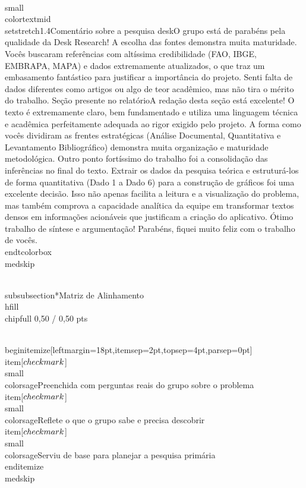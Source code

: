 \documentclass[11pt, a4paper]{article}
\newcommand{\chipfull}[1]{\colorbox{sagedim}{\color{sage}\semibold\small\strut\ #1\ }}
\begin{document}
{\\small\\color{textmid}\\setstretch{1.4}Comentário sobre a pesquisa deskO grupo está de parabéns pela qualidade da Desk Research! A escolha das fontes demonstra muita maturidade. Vocês buscaram referências com altíssima credibilidade (FAO, IBGE, EMBRAPA, MAPA) e dados extremamente atualizados, o que traz um embasamento fantástico para justificar a importância do projeto. Senti falta de dados diferentes como artigos ou algo de teor acadêmico, mas não tira o mérito do trabalho.
Seção presente no relatórioA redação desta seção está excelente! O texto é extremamente claro, bem fundamentado e utiliza uma linguagem técnica e acadêmica perfeitamente adequada ao rigor exigido pelo projeto. A forma como vocês dividiram as frentes estratégicas (Análise Documental, Quantitativa e Levantamento Bibliográfico) demonstra muita organização e maturidade metodológica.
Outro ponto fortíssimo do trabalho foi a consolidação das inferências no final do texto. Extrair os dados da pesquisa teórica e estruturá-los de forma quantitativa (Dado 1 a Dado 6) para a construção de gráficos foi uma excelente decisão. Isso não apenas facilita a leitura e a visualização do problema, mas também comprova a capacidade analítica da equipe em transformar textos densos em informações acionáveis que justificam a criação do aplicativo.
Ótimo trabalho de síntese e argumentação! Parabéns, fiquei muito feliz com o trabalho de vocês.}
\\end{tcolorbox}
\\medskip

\\subsubsection*{Matriz de Alinhamento \\hfill {\\chipfull 0,50 / 0,50 pts}}

\\begin{itemize}[leftmargin=18pt,itemsep=2pt,topsep=4pt,parsep=0pt]
  \\item[$\\checkmark$] {\\small\\color{sage}Preenchida com perguntas reais do grupo sobre o problema}
  \\item[$\\checkmark$] {\\small\\color{sage}Reflete o que o grupo sabe e precisa descobrir}
  \\item[$\\checkmark$] {\\small\\color{sage}Serviu de base para planejar a pesquisa primária}
\\end{itemize}
\\medskip
\end{document}
